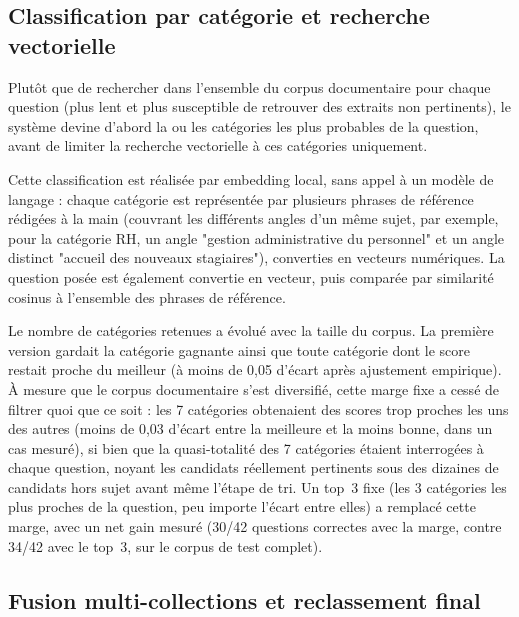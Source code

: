 \documentclass[12pt,a4paper]{report}
\begin{document}
\subsection{Classification par catégorie et recherche vectorielle}

Plutôt que de rechercher dans l'ensemble du corpus documentaire pour
chaque question (plus lent et plus susceptible de retrouver des
extraits non pertinents), le système devine d'abord la ou les
catégories les plus probables de la question, avant de limiter la
recherche vectorielle à ces catégories uniquement.

Cette classification est réalisée par embedding local, sans appel à un
modèle de langage : chaque catégorie est représentée par plusieurs
phrases de référence rédigées à la main (couvrant les différents angles
d'un même sujet, par exemple, pour la catégorie RH, un angle
"gestion administrative du personnel" et un angle distinct "accueil des
nouveaux stagiaires"), converties en vecteurs numériques. La question
posée est également convertie en vecteur, puis comparée par similarité
cosinus à l'ensemble des phrases de référence.

Le nombre de catégories retenues a évolué avec la taille du corpus. La
première version gardait la catégorie gagnante ainsi que toute catégorie
dont le score restait proche du meilleur (à moins de 0,05 d'écart après
ajustement empirique). À mesure que le corpus documentaire s'est
diversifié, cette marge fixe a cessé de filtrer quoi que ce soit : les
7 catégories obtenaient des scores trop proches les uns des autres
(moins de 0,03 d'écart entre la meilleure et la moins bonne, dans un cas
mesuré), si bien que la quasi-totalité des 7 catégories étaient
interrogées à chaque question, noyant les candidats réellement
pertinents sous des dizaines de candidats hors sujet avant même l'étape
de tri. Un top~3 fixe (les 3 catégories les plus proches de la question,
peu importe l'écart entre elles) a remplacé cette marge, avec un net
gain mesuré (30/42 questions correctes avec la marge, contre 34/42 avec
le top~3, sur le corpus de test complet).

\subsection{Fusion multi-collections et reclassement final}
\end{document}
